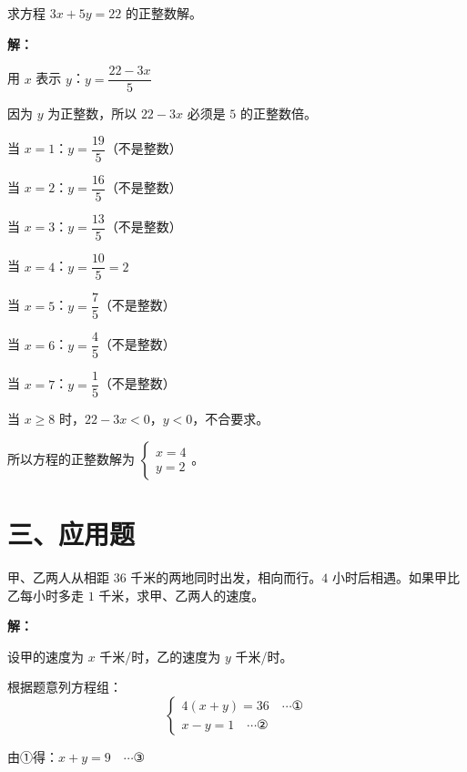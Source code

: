 \documentclass[12pt, a4paper]{ctexart}
\begin{document}
\bigskip

\begin{examplebox}[【例题7】二元一次方程的整数解]
求方程 $3x + 5y = 22$ 的正整数解。
\end{examplebox}

\textbf{解：}

用 $x$ 表示 $y$：$y = \dfrac{22 - 3x}{5}$

因为 $y$ 为正整数，所以 $22 - 3x$ 必须是 $5$ 的正整数倍。

当 $x = 1$：$y = \dfrac{19}{5}$（不是整数）

当 $x = 2$：$y = \dfrac{16}{5}$（不是整数）

当 $x = 3$：$y = \dfrac{13}{5}$（不是整数）

当 $x = 4$：$y = \dfrac{10}{5} = 2$ \quad \checkmark

当 $x = 5$：$y = \dfrac{7}{5}$（不是整数）

当 $x = 6$：$y = \dfrac{4}{5}$（不是整数）

当 $x = 7$：$y = \dfrac{1}{5}$（不是整数）

当 $x \geqslant 8$ 时，$22 - 3x < 0$，$y < 0$，不合要求。

所以方程的正整数解为 $\boxed{\begin{cases} x = 4 \\ y = 2 \end{cases}}$。

\section*{\textcolor{apppurple}{三、应用题}}

\begin{appbox}[【应用1】行程问题]
甲、乙两人从相距 $36$ 千米的两地同时出发，相向而行。$4$ 小时后相遇。如果甲比乙每小时多走 $1$ 千米，求甲、乙两人的速度。
\end{appbox}

\textbf{解：}

设甲的速度为 $x$ 千米/时，乙的速度为 $y$ 千米/时。

根据题意列方程组：
$$\begin{cases} 4(x + y) = 36 \quad \cdots ① \\ x - y = 1 \quad \cdots ② \end{cases}$$

由①得：$x + y = 9 \quad \cdots ③$
\end{document}
